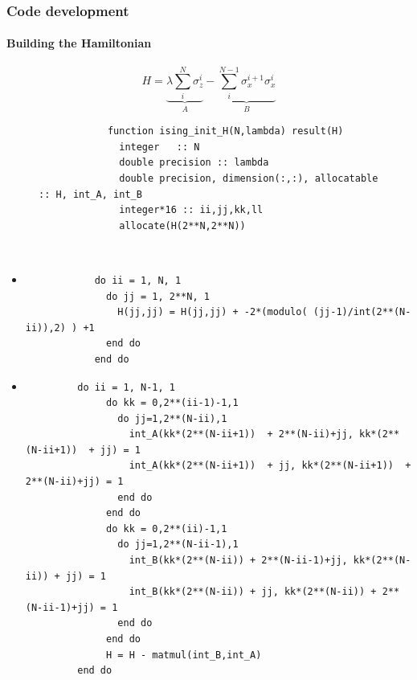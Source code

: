 \documentclass[pt12]{beamer}
\newcommand\encircle[1]{%
	\tikz[baseline=(X.base)] 
	\node (X) [draw, shape=circle, inner sep=0] {\strut #1};}
\begin{document}
\begin{frame}[fragile,label=Code development]
	\frametitle{Code development}
	\framesubtitle{Building the Hamiltonian}
	\fontsize{6pt}{10pt}\selectfont
	\tableofcontents[pausesections]
	\begin{equation*}
		H = \underbrace{\lambda\sum_i^N \sigma_z^i}_A - \underbrace{\sum_i^{N-1}\sigma_x^{i+1}\sigma_x^i}_B
	\end{equation*}\vspace*{-.5cm}
	\begin{figure}[!h]
		\begin{verbatim}
			function ising_init_H(N,lambda) result(H)
			  integer   :: N
			  double precision :: lambda
			  double precision, dimension(:,:), allocatable :: H, int_A, int_B
			  integer*16 :: ii,jj,kk,ll
			  allocate(H(2**N,2**N))
		\end{verbatim}
	\end{figure}\text{ }\vspace*{-.5cm}\\
	\begin{itemize}
		\item[{\encircle{A}}]\vspace*{-.42cm}
		\begin{verbatim}
			do ii = 1, N, 1
			  do jj = 1, 2**N, 1
			    H(jj,jj) = H(jj,jj) + -2*(modulo( (jj-1)/int(2**(N-ii)),2) ) +1
			  end do
			end do
		\end{verbatim}
	    \item[{\encircle{B}}]
	    \begin{verbatim}
	     do ii = 1, N-1, 1
	    	  do kk = 0,2**(ii-1)-1,1
	    	    do jj=1,2**(N-ii),1
	    	      int_A(kk*(2**(N-ii+1))  + 2**(N-ii)+jj, kk*(2**(N-ii+1))  + jj) = 1
	    	      int_A(kk*(2**(N-ii+1))  + jj, kk*(2**(N-ii+1))  + 2**(N-ii)+jj) = 1
	    	    end do
	    	  end do
	    	  do kk = 0,2**(ii)-1,1
	    	    do jj=1,2**(N-ii-1),1
	    	      int_B(kk*(2**(N-ii)) + 2**(N-ii-1)+jj, kk*(2**(N-ii)) + jj) = 1
	    	      int_B(kk*(2**(N-ii)) + jj, kk*(2**(N-ii)) + 2**(N-ii-1)+jj) = 1
	    	    end do
	    	  end do
	    	  H = H - matmul(int_B,int_A)
	     end do
	    \end{verbatim}
	     
	\end{itemize}
\end{frame}
\end{document}
